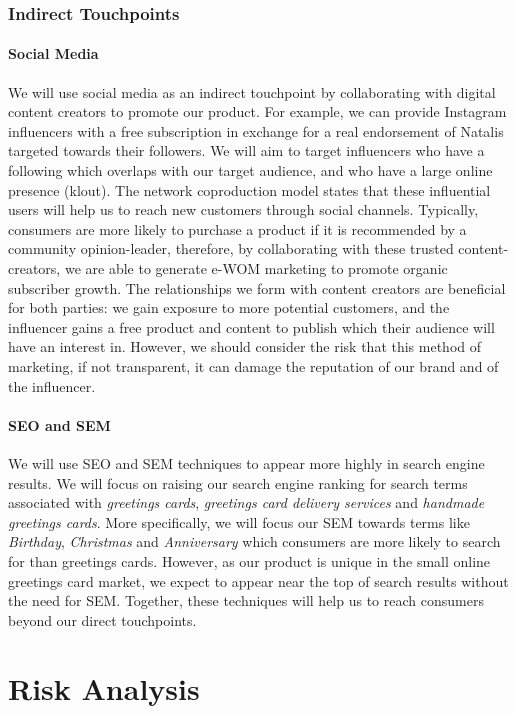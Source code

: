 \documentclass[10pt,a4paper]{article}
\begin{document}
\subsubsection*{Indirect Touchpoints}
\paragraph*{Social Media}
We will use social media as an indirect touchpoint by collaborating with digital content creators to promote our product. For example, we can provide Instagram influencers with a free subscription in exchange for a real endorsement of Natalis targeted towards their followers. We will aim to target influencers who have a following which overlaps with our target audience, and who have a large online presence (klout). The network coproduction model states that these influential users will help us to reach new customers through social channels. Typically, consumers are more likely to purchase a product if it is recommended by a community opinion-leader, therefore, by collaborating with these trusted content-creators, we are able to generate e-WOM marketing to promote organic subscriber growth. The relationships we form with content creators are beneficial for both parties: we gain exposure to more potential customers, and the influencer gains a free product and content to publish which their audience will have an interest in. However, we should consider the risk that this method of marketing, if not transparent, it can damage the reputation of our brand and of the influencer.


\paragraph{SEO and SEM}
We will use SEO and SEM techniques to appear more highly in search engine results. We will focus on raising our search engine ranking for search terms associated with \textit{greetings cards}, \textit{greetings card delivery services} and \textit{handmade greetings cards}. More specifically, we will focus our SEM towards terms like \textit{Birthday}, \textit{Christmas} and \textit{Anniversary} which consumers are more likely to search for than greetings cards. However, as our product is unique in the small online greetings card market, we expect to appear near the top of search results without the need for SEM. Together, these techniques will help us to reach consumers beyond our direct touchpoints.




\section*{Risk Analysis}
\end{document}
